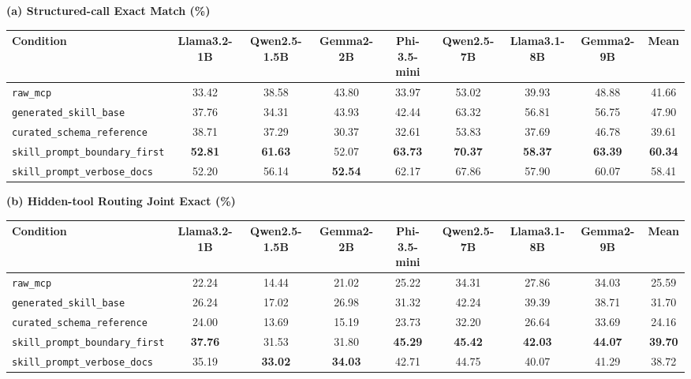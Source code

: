 \documentclass[11pt]{article}
\begin{document}
\begin{table}[t]
\centering
\footnotesize
\setlength{\tabcolsep}{4pt}
\renewcommand{\arraystretch}{1.1}

\textbf{(a) Structured-call Exact Match (\%)} \\[2pt]
\begin{tabular}{@{}lcccccccc@{}}
\toprule
\textbf{Condition} & \textbf{Llama3.2-1B} & \textbf{Qwen2.5-1.5B} & \textbf{Gemma2-2B} & \textbf{Phi-3.5-mini} & \textbf{Qwen2.5-7B} & \textbf{Llama3.1-8B} & \textbf{Gemma2-9B} & \textbf{Mean} \\
\midrule
\texttt{raw\_mcp}                       & 33.42 & 38.58 & 43.80 & 33.97 & 53.02 & 39.93 & 48.88 & 41.66 \\
\texttt{generated\_skill\_base}         & 37.76 & 34.31 & 43.93 & 42.44 & 63.32 & 56.81 & 56.75 & 47.90 \\
\texttt{curated\_schema\_reference}     & 38.71 & 37.29 & 30.37 & 32.61 & 53.83 & 37.69 & 46.78 & 39.61 \\
\texttt{skill\_prompt\_boundary\_first} & \textbf{52.81} & \textbf{61.63} & 52.07          & \textbf{63.73} & \textbf{70.37} & \textbf{58.37} & \textbf{63.39} & \textbf{60.34} \\
\texttt{skill\_prompt\_verbose\_docs}   & 52.20          & 56.14          & \textbf{52.54} & 62.17          & 67.86          & 57.90          & 60.07          & 58.41 \\
\bottomrule
\end{tabular}

\vspace{6pt}

\textbf{(b) Hidden-tool Routing Joint Exact (\%)} \\[2pt]
\begin{tabular}{@{}lcccccccc@{}}
\toprule
\textbf{Condition} & \textbf{Llama3.2-1B} & \textbf{Qwen2.5-1.5B} & \textbf{Gemma2-2B} & \textbf{Phi-3.5-mini} & \textbf{Qwen2.5-7B} & \textbf{Llama3.1-8B} & \textbf{Gemma2-9B} & \textbf{Mean} \\
\midrule
\texttt{raw\_mcp}                       & 22.24          & 14.44          & 21.02          & 25.22          & 34.31          & 27.86          & 34.03          & 25.59 \\
\texttt{generated\_skill\_base}         & 26.24          & 17.02          & 26.98          & 31.32          & 42.24          & 39.39          & 38.71          & 31.70 \\
\texttt{curated\_schema\_reference}     & 24.00          & 13.69          & 15.19          & 23.73          & 32.20          & 26.64          & 33.69          & 24.16 \\
\texttt{skill\_prompt\_boundary\_first} & \textbf{37.76} & 31.53          & 31.80          & \textbf{45.29} & \textbf{45.42} & \textbf{42.03} & \textbf{44.07} & \textbf{39.70} \\
\texttt{skill\_prompt\_verbose\_docs}   & 35.19          & \textbf{33.02} & \textbf{34.03} & 42.71          & 44.75          & 40.07          & 41.29          & 38.72 \\
\bottomrule
\end{tabular}


\end{table}
\end{document}
